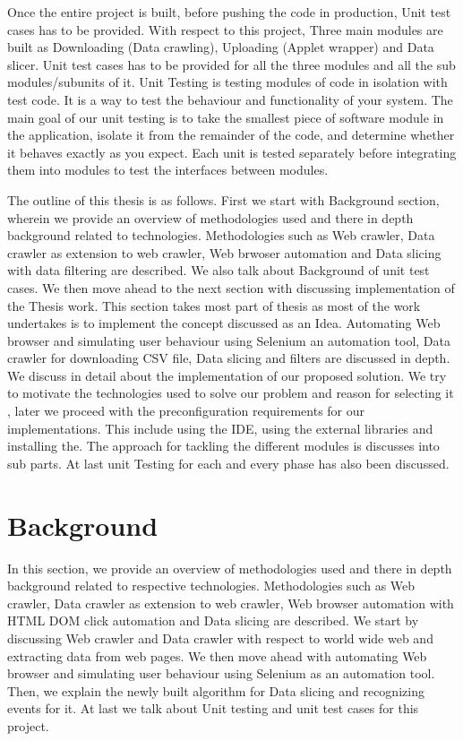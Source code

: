 \documentclass[article,type=msc,colorback,accentcolor=tud9c,twoside,11pt]{tudthesis}
\begin{document}
Once the entire project is built, before pushing the code in production, Unit test cases has to be provided. With respect to this project, Three main modules are built as Downloading (Data crawling), Uploading (Applet wrapper) and Data slicer. Unit test cases has to be provided for all the three modules and all the sub modules/subunits of it. Unit Testing\cite{EffectivnessofUnitTest} is testing modules of code in isolation with test code. It is a way to test the behaviour and functionality of your system. The main goal of our unit testing is to take the smallest piece of software module in the application, isolate it from the remainder of the code, and determine whether it behaves exactly as you expect. Each unit is tested separately before integrating them into modules to test the interfaces between modules.


The outline of this thesis is as follows. First we start with Background section, wherein we provide an overview of methodologies used and there in depth background related to technologies. Methodologies such as Web crawler, Data crawler as extension to web crawler, Web brwoser automation and Data slicing with data filtering are described. We also talk about Background of unit test cases. We then move ahead to the next section with discussing implementation of the Thesis work. This section takes most part of thesis as most of the work undertakes is to implement the concept discussed as an Idea. Automating Web browser and simulating user behaviour using Selenium an automation tool, Data crawler for downloading CSV file, Data slicing and filters are discussed in depth. We discuss in detail about the implementation of our proposed solution. We try to motivate the technologies used to solve our problem and reason for selecting it , later we proceed with the preconfiguration requirements for our implementations. This include using the IDE, using the external libraries and installing the. The approach for tackling the different modules is discusses into sub parts. At last unit Testing for each and every phase has also been discussed.

\clearpage
\section{Background}
In this section, we provide an overview of methodologies used and there in depth background related to respective technologies. Methodologies such as Web crawler, Data crawler as extension to web crawler, Web browser automation with HTML DOM click automation and Data slicing are described. We start by discussing Web crawler and Data crawler with respect to world wide web and extracting data from web pages. We then move ahead with automating Web browser and simulating user behaviour using Selenium as an automation tool. Then, we explain the newly built algorithm for Data slicing and recognizing events for it. At last we talk about Unit testing and unit test cases for this project.
\end{document}

